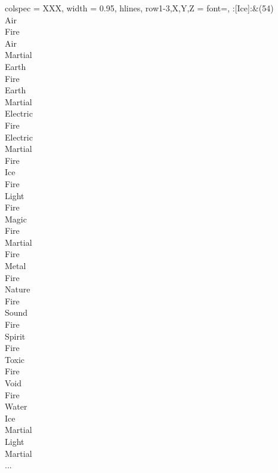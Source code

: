 \begin{longtblr}[
	caption = {2v1 Defending Weak},
	label = {2v1-Defending-Weak},
]{
	colspec = {XXX}, width = 0.95\linewidth,
	hlines,
	row{1-3,X,Y,Z} = {font=\bfseries},
}
	:[Ice]:&{(54)\\
	Air \\
	Fire \\
	Air \\
	Martial \\
	Earth \\
	Fire \\
	Earth \\
	Martial \\
	Electric \\
	Fire \\
	Electric \\
	Martial \\
	Fire \\
	Ice \\
	Fire \\
	Light \\
	Fire \\
	Magic \\
	Fire \\
	Martial \\
	Fire \\
	Metal \\
	Fire \\
	Nature \\
	Fire \\
	Sound \\
	Fire \\
	Spirit \\
	Fire \\
	Toxic \\
	Fire \\
	Void \\
	Fire \\
	Water \\
	Ice \\
	Martial \\
	Light \\
	Martial \\
	...\\
	}\\


\end{longtblr}

